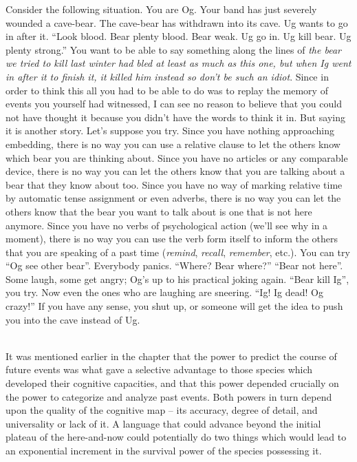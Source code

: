 Consider the following situation. You are Og. Your band has just severely wounded a cave-bear. The cave-bear has withdrawn into its cave. Ug wants to go in after it. ``Look blood. Bear plenty blood. Bear weak. Ug go in. Ug kill bear. Ug plenty strong.'' You want to be able to say something along the lines of \textit{the bear we tried to kill last winter had bled at least as much as this one, but when Ig went in after it to finish it, it killed him instead so don't be such an idiot}. Since in order to think this all you had to be able to do was to replay the memory of events you yourself had witnessed, I can see no reason to believe that you could not have thought it because you didn't have the words to think it in. But saying it is another story. Let's suppose you try. Since you have nothing approaching embedding, there is no way you can use a relative clause to let the others know which bear you are thinking about. Since you have no articles or any comparable device, there is no way you can let the others know that you are talking about a bear that they know about too. Since you have no way of marking relative time by automatic tense assignment or even adverbs, there is no way you can let the others know that the bear you want to talk about is one that is not here anymore. Since you have no verbs of psychological action (we'll see why in a moment), there is no way you can use the verb form itself to inform the others that you are speaking of a past time (\textit{remind}, \textit{recall}, \textit{remember}, etc.). You can try ``Og see other bear''. Everybody panics. ``Where? Bear where?'' ``Bear not here''. Some laugh, some get angry; Og's up to his practical joking again. ``Bear kill Ig'', you try. Now even the ones who are laughing are sneering. ``Ig! Ig dead! Og crazy!'' If you have any sense, you shut up, or someone will get the idea to push you into the cave instead of Ug.\\\\

It was mentioned earlier in the chapter that the power to predict the course of future events was what gave a selective advantage to those species which developed their cognitive capacities, and that this power depended crucially on the power to categorize and analyze past events. Both powers in turn depend upon the quality of the cognitive map --
its accuracy, degree of detail, and universality or lack of it. A language that could advance beyond the initial plateau of the here-and-now could potentially do two things which would lead to an exponential increment in the survival power of the species possessing it.

